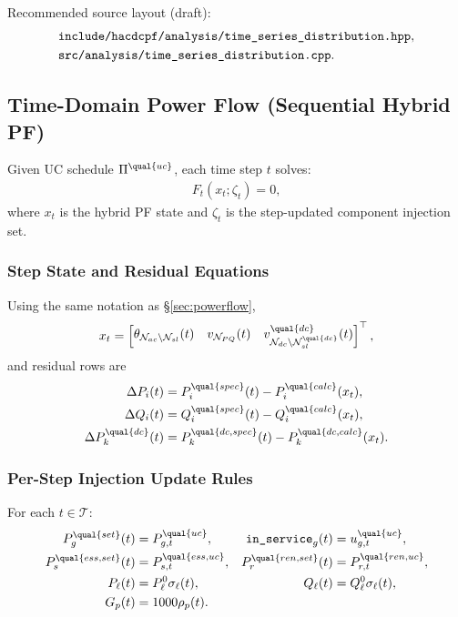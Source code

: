Recommended source layout (draft):
\begin{align}
&\texttt{include/hacdcpf/analysis/time\_series\_distribution.hpp}, \notag\\
&\texttt{src/analysis/time\_series\_distribution.cpp}.
\end{align}

\subsection{Time-Domain Power Flow (Sequential Hybrid PF)}
\label{sec:tdpf}

Given UC schedule \(\Pi^{\qual{uc}}\), each time step \(t\) solves:
\begin{align}
F_t(x_t; \zeta_t) = 0,
\end{align}
where \(x_t\) is the hybrid PF state and \(\zeta_t\) is the step-updated
component injection set.

\subsubsection{Step State and Residual Equations}

Using the same notation as \S\ref{sec:powerflow},
\begin{align}
x_t =
\begin{bmatrix}
\theta_{\mathcal{N}_{ac}\setminus\mathcal{N}_{sl}}(t) &
v_{\mathcal{N}_{PQ}}(t) &
v_{\mathcal{N}_{dc}\setminus\mathcal{N}^{\qual{dc}}_{sl}}^{\qual{dc}}(t)
\end{bmatrix}^{\top},
\end{align}
and residual rows are
\begin{align}
\Delta P_i(t) &= P_i^{\qual{spec}}(t)-P_i^{\qual{calc}}(x_t), \\
\Delta Q_i(t) &= Q_i^{\qual{spec}}(t)-Q_i^{\qual{calc}}(x_t), \\
\Delta P_k^{\qual{dc}}(t) &= P_k^{\qual{dc,spec}}(t)-P_k^{\qual{dc,calc}}(x_t).
\label{eq:tdpf-residual-impl}
\end{align}

\subsubsection{Per-Step Injection Update Rules}

For each \(t\in\mathcal{T}\):
\begin{align}
P_{g}^{\qual{set}}(t) &= P_{g,t}^{\qual{uc}}, &
\texttt{in\_service}_g(t) &= u_{g,t}^{\qual{uc}}, \\
P_{s}^{\qual{ess,set}}(t) &= P_{s,t}^{\qual{ess,uc}}, &
P_{r}^{\qual{ren,set}}(t) &= P_{r,t}^{\qual{ren,uc}}, \\
P_{\ell}(t) &= P_\ell^0\sigma_\ell(t), &
Q_{\ell}(t) &= Q_\ell^0\sigma_\ell(t), \\
G_p(t) &= 1000\rho_p(t).
\label{eq:tdpf-updates-impl}
\end{align}

